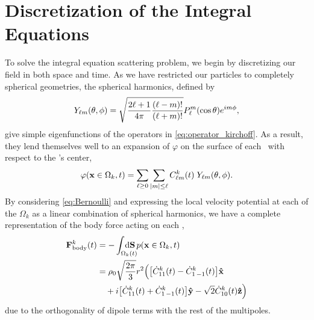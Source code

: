 \section{Discretization of the Integral Equations}

To solve the integral equation scattering problem, we begin by discretizing our field in both space and time.
As we have restricted our particles to completely spherical geometries, the spherical harmonics, defined by
\begin{equation} \label{eq:Ylms}
  Y_{\ell m}\quantity(\theta, \phi) = \sqrt{\frac{2\ell + 1}{4\pi}\frac{\quantity(\ell - m)!}{\quantity(\ell + m)!}}P_\ell^m\quantity(\cos\theta)e^{i m \phi},
\end{equation}
give simple eigenfunctions of the operators in \cref{eq:operator_kirchoff}.
As a result, they lend themselves well to an expansion of $\varphi$ on the surface of each \bubble\ with respect to the \bubble's center,
\begin{equation} \label{eq:potential_expansion}
  \varphi(\vb{x}\in\Omega_k, t) = \sum_{\ell \ge 0} \sum_{\abs{m} \le \ell} C^k_{\ell m}(t) \; Y_{\ell m}\qty(\theta, \phi).
\end{equation}
By considering \cref{eq:Bernoulli} and expressing the local velocity potential at each of the $\Omega_k$ as a linear combination of spherical harmonics, we have a complete representation of the body force acting on each \bubble,
\begin{align}
  \vb{F}_\text{body}^k(t) &= - \int_{\Omega_k(t)} \mkern-30mu \dd{\vb{S}} p(\vb{x}\in \Omega_k, t) \nonumber \\
  &= \rho_0 \sqrt{\frac{2\pi}{3}}r^2 \Big(\qty[\dot{C}^k_{11}(t) - \dot{C}^k_{1\, -1}(t)]\vu{x}         \nonumber \\
  &\quad + i\qty[\dot{C}^k_{11}(t) + \dot{C}^k_{1\,-1}(t)]\vu{y} - \sqrt{2}\dot{C}^k_{10}(t)\vu{z}\Big)
\end{align}
due to the orthogonality of dipole terms with the rest of the multipoles.

